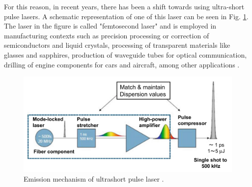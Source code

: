 For this reason, in recent years, there has been a shift towards using ultra-short pulse lasers. A schematic representation of one of this laser can be seen in Fig. \ref{fig:duripoco}. The laser in the figure is called "femtosecond laser" and is employed in manufacturing contexts such as precision processing or correction of semiconductors and liquid crystals, processing of transparent materials like glasses and sapphires, production of waveguide tubes for optical communication, drilling of engine components for cars and aircraft, among other applications \cite{katayama_fundamentals_2020}.
\begin{figure}
    \centering
    \includegraphics[scale=0.4]{Images/duripoco.png}
    \caption[Ultrashort pulse laser.]{Emission mechanism of ultrashort pulse laser \cite{katayama_fundamentals_2020}.}
    \label{fig:duripoco}
\end{figure}

